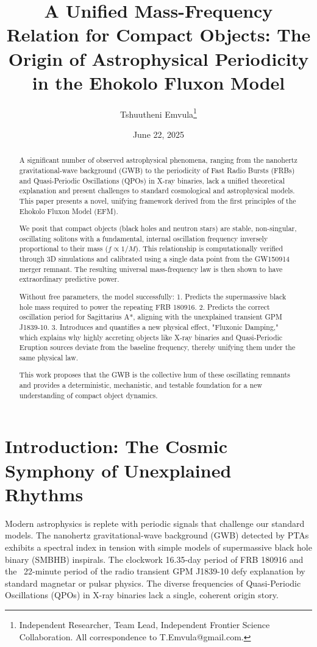 \documentclass[11pt, twoside]{article}
\title{A Unified Mass-Frequency Relation for Compact Objects: The Origin of Astrophysical Periodicity in the Ehokolo Fluxon Model}
\author{Tshuutheni Emvula\thanks{Independent Researcher, Team Lead, Independent Frontier Science Collaboration. All correspondence to T.Emvula@gmail.com.}}
\date{June 22, 2025}
\begin{document}
\maketitle

\begin{abstract}
A significant number of observed astrophysical phenomena, ranging from the nanohertz gravitational-wave background (GWB) to the periodicity of Fast Radio Bursts (FRBs) and Quasi-Periodic Oscillations (QPOs) in X-ray binaries, lack a unified theoretical explanation and present challenges to standard cosmological and astrophysical models. This paper presents a novel, unifying framework derived from the first principles of the Ehokolo Fluxon Model (EFM).

We posit that compact objects (black holes and neutron stars) are stable, non-singular, oscillating solitons with a fundamental, internal oscillation frequency inversely proportional to their mass (\(f \propto 1/M\)). This relationship is computationally verified through 3D simulations and calibrated using a single data point from the GW150914 merger remnant. The resulting universal mass-frequency law is then shown to have extraordinary predictive power.

Without free parameters, the model successfully:
1. Predicts the supermassive black hole mass required to power the repeating FRB 180916.
2. Predicts the correct oscillation period for Sagittarius A*, aligning with the unexplained transient GPM J1839-10.
3. Introduces and quantifies a new physical effect, "Fluxonic Damping," which explains why highly accreting objects like X-ray binaries and Quasi-Periodic Eruption sources deviate from the baseline frequency, thereby unifying them under the same physical law.

This work proposes that the GWB is the collective hum of these oscillating remnants and provides a deterministic, mechanistic, and testable foundation for a new understanding of compact object dynamics.
\end{abstract}

\section{Introduction: The Cosmic Symphony of Unexplained Rhythms}
Modern astrophysics is replete with periodic signals that challenge our standard models. The nanohertz gravitational-wave background (GWB) detected by PTAs \citep{NANOGrav2023} exhibits a spectral index in tension with simple models of supermassive black hole binary (SMBHB) inspirals. The clockwork 16.35-day period of FRB 180916 \citep{FRB_period} and the ~22-minute period of the radio transient GPM J1839-10 \citep{GPM_transient} defy explanation by standard magnetar or pulsar physics. The diverse frequencies of Quasi-Periodic Oscillations (QPOs) in X-ray binaries lack a single, coherent origin story.
\end{document}
